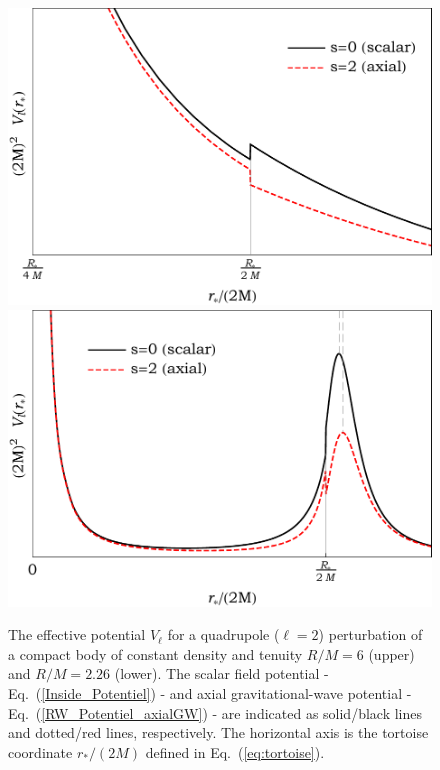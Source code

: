 \documentclass[aps,prd,longbibliography,reprint,twocolumn,amsmath,amssymb,amsfonts,showpacs,footnote,superscriptaddress]{revtex4-1}%
\begin{document}
 \begin{figure}[htb]
\centering
 \includegraphics[scale=0.50]{potentials_s02_CD_R6L2_v4} \\ \vspace{0.2cm}
 \includegraphics[scale=0.50]{potentials_s02_CD_R2p26L2_v4}
\caption{\label{RP_approx_2Mw_3_6_s_1} The effective potential $V_\ell$ for a quadrupole ($\ell =2$) perturbation of a compact body of constant density and tenuity $R/M = 6$ (upper) and $R /M = 2.26$ (lower). The scalar field potential - Eq.~(\ref{Inside_Potentiel}) - and axial gravitational-wave potential - Eq.~(\ref{RW_Potentiel_axialGW}) - are indicated as solid/black lines and dotted/red lines, respectively. The horizontal axis is the tortoise coordinate $r_\ast/(2M)$ defined in Eq.~(\ref{eq:tortoise}).}
\label{fig:Veff}
\end{figure}
\end{document}
